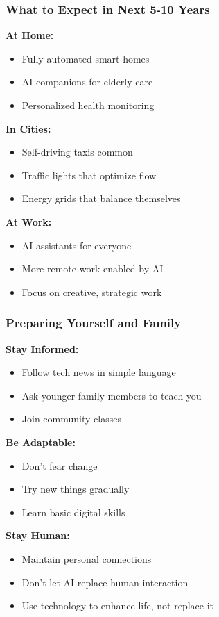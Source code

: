 \begin{frame}[fragile]\frametitle{What to Expect in Next 5-10 Years}

{\bf At Home:}
\begin{itemize}
\item Fully automated smart homes
\item AI companions for elderly care
\item Personalized health monitoring
\end{itemize}

{\bf In Cities:}
\begin{itemize}
\item Self-driving taxis common
\item Traffic lights that optimize flow
\item Energy grids that balance themselves
\end{itemize}

{\bf At Work:}
\begin{itemize}
\item AI assistants for everyone
\item More remote work enabled by AI
\item Focus on creative, strategic work
\end{itemize}
\end{frame}

\begin{frame}[fragile]\frametitle{Preparing Yourself and Family}

{\bf Stay Informed:}
\begin{itemize}
\item Follow tech news in simple language
\item Ask younger family members to teach you
\item Join community classes
\end{itemize}

{\bf Be Adaptable:}
\begin{itemize}
\item Don't fear change
\item Try new things gradually
\item Learn basic digital skills
\end{itemize}

{\bf Stay Human:}
\begin{itemize}
\item Maintain personal connections
\item Don't let AI replace human interaction
\item Use technology to enhance life, not replace it
\end{itemize}
\end{frame}

